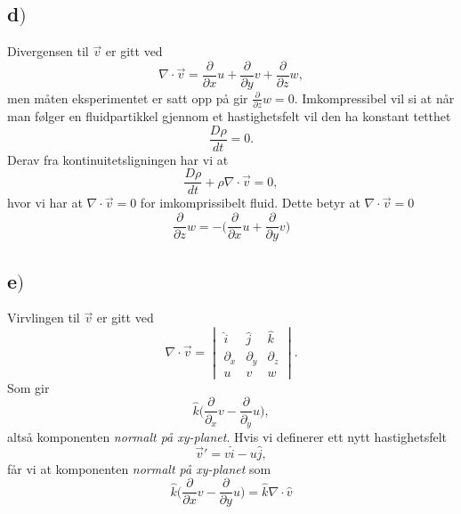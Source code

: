 \documentclass{article}
\begin{document}
\subsection*{d$)$}
Divergensen til $\vec{v}$ er gitt ved
\begin{equation}
\nabla\cdot\vec{v} = \frac{\partial}{\partial x}u + \frac{\partial}{\partial y}v + \frac{\partial}{\partial z}w,
\end{equation}
men måten eksperimentet er satt opp på gir $\frac{\partial}{\partial z}w = 0$.
Imkompressibel vil si at når man følger en fluidpartikkel gjennom et hastighetsfelt vil den ha konstant tetthet
\begin{equation}
\frac{D\rho}{dt} = 0.
\end{equation}
Derav fra kontinuitetsligningen har vi at
\begin{equation}
\frac{D\rho}{dt} + \rho\nabla\cdot\vec{v} = 0,
\end{equation}
hvor vi har at $\nabla\cdot\vec{v} = 0$ for imkomprissibelt fluid. Dette betyr at $\nabla\cdot\vec{v} = 0$
\begin{equation}
\frac{\partial}{\partial z}w = -\bigg(\frac{\partial}{\partial x}u + \frac{\partial}{\partial y}v\bigg)
\end{equation}

\subsection*{e$)$}
Virvlingen til $\vec{v}$ er gitt ved
\begin{equation}
\nabla\cdot\vec{v} = \begin{vmatrix}\hat{i}&\hat{j}&\hat{k}\\\partial_{x}&\partial_{y}&\partial_{z}\\u&v&w\end{vmatrix}. 
\end{equation}
Som gir
\begin{equation}
\hat{k}\bigg(\frac{\partial}{\partial_{x}}v - \frac{\partial}{\partial_{y}}u \bigg),
\end{equation}
altså komponenten \textit{normalt på xy-planet}.
Hvis vi definerer ett nytt hastighetsfelt
\begin{equation}
\vec{v}' = v\hat{i} - u\hat{j},
\end{equation}
får vi at komponenten \textit{normalt på xy-planet} som
\begin{equation}
\hat{k}\bigg( \frac{\partial}{\partial x}v - \frac{\partial}{\partial y}u \bigg) = \hat{k}\nabla\cdot\hat{v}
\end{equation}
\end{document}
